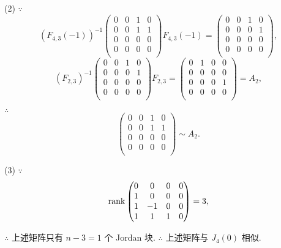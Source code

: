 \documentclass[color=black,device=normal,lang=cn,mode=geye]{elegantnote}
\begin{document}
\begin{solution}
    (2) $\because$
    \[(F_{4,3}(-1))^{-1}\begin{pmatrix}
        0 & 0 & 1 & 0 \\
        0 & 0 & 1 & 1 \\
        0 & 0 & 0 & 0 \\
        0 & 0 & 0 & 0 \\
    \end{pmatrix}F_{4,3}(-1)=\begin{pmatrix}
        0 & 0 & 1 & 0 \\
        0 & 0 & 0 & 1 \\
        0 & 0 & 0 & 0 \\
        0 & 0 & 0 & 0 \\
    \end{pmatrix},\]
    \[(F_{2,3})^{-1}\begin{pmatrix}
        0 & 0 & 1 & 0 \\
        0 & 0 & 0 & 1 \\
        0 & 0 & 0 & 0 \\
        0 & 0 & 0 & 0 \\
    \end{pmatrix}F_{2,3}=\begin{pmatrix}
        0 & 1 & 0 & 0 \\
        0 & 0 & 0 & 0 \\
        0 & 0 & 0 & 1 \\
        0 & 0 & 0 & 0 \\
    \end{pmatrix}=A_2,\]

    $\therefore$
    \[\begin{pmatrix}
        0 & 0 & 1 & 0 \\
        0 & 0 & 1 & 1 \\
        0 & 0 & 0 & 0 \\
        0 & 0 & 0 & 0 \\
    \end{pmatrix}\sim A_2.\]

    (3) $\because$
    \[\operatorname{rank} \begin{pmatrix}
        0 & 0 & 0 & 0 \\
        1 & 0 & 0 & 0 \\
        1 & -1 & 0 & 0 \\
        1 & 1 & 1 & 0 \\
    \end{pmatrix}=3,\]

    $\therefore$ 上述矩阵只有 $n-3=1$ 个 Jordan 块. $\therefore$ 上述矩阵与 $J_4(0)$ 相似.


\end{solution}
\end{document}
